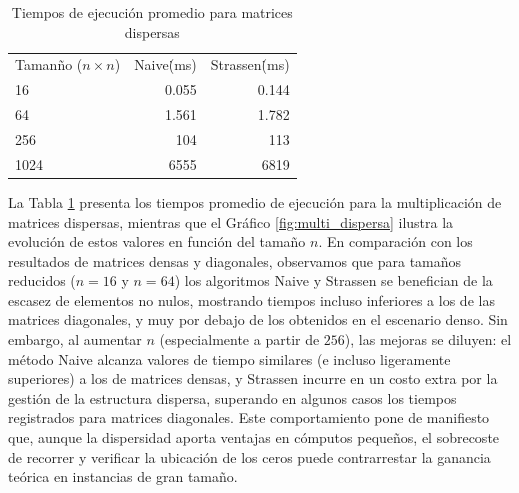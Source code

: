 \begin{table}[ht]
  \centering
  \begin{tabular}{lrr}

    Tamanño ($n \times n$)  & Naive\.(ms) & Strassen\.(ms)\\

    16  & 0.055 & 0.144  \\
    64  & 1.561  & 1.782\\
    256& 104& 113\\
    1024& 6555 &  6819\\

  \end{tabular}
  \caption{Tiempos de ejecución promedio para matrices dispersas}
  \label{tab:dispersa-result}
\end{table}

La Tabla \ref{tab:dispersa-result} presenta los tiempos promedio de ejecución para la multiplicación de matrices dispersas, mientras que el Gráfico \ref{fig:multi_dispersa} ilustra la evolución de estos valores en función del tamaño \(n\). En comparación con los resultados de matrices densas y diagonales, observamos que para tamaños reducidos (\(n=16\) y \(n=64\)) los algoritmos Naive y Strassen se benefician de la escasez de elementos no nulos, mostrando tiempos incluso inferiores a los de las matrices diagonales, y muy por debajo de los obtenidos en el escenario denso. Sin embargo, al aumentar \(n\) (especialmente a partir de \(256\)), las mejoras se diluyen: el método Naive alcanza valores de tiempo similares (e incluso ligeramente superiores) a los de matrices densas, y Strassen incurre en un costo extra por la gestión de la estructura dispersa, superando en algunos casos los tiempos registrados para matrices diagonales. Este comportamiento pone de manifiesto que, aunque la dispersidad aporta ventajas en cómputos pequeños, el sobrecoste de recorrer y verificar la ubicación de los ceros puede contrarrestar la ganancia teórica en instancias de gran tamaño.


